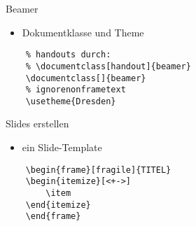 \begin{frame}[fragile]{Beamer}
    \begin{itemize}[<+->]
        \item Dokumentklasse und Theme
    \end{itemize}
\begin{lstlisting}
    % handouts durch:
    % \documentclass[handout]{beamer}
    \documentclass[]{beamer}
    % ignorenonframetext
    \usetheme{Dresden}
\end{lstlisting}
\end{frame}

\begin{frame}[fragile]{Slides erstellen}
\begin{itemize}[<+->]
    \item ein Slide-Template
\end{itemize}
\begin{lstlisting}
    \begin{frame}[fragile]{TITEL}
    \begin{itemize}[<+->]
        \item 
    \end{itemize}
    \end{frame}
\end{lstlisting}
\end{frame}
